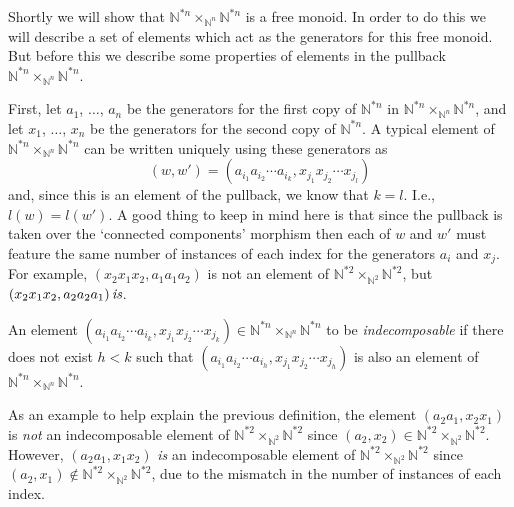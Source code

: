 Shortly we will show that $\mathbb{N}^{\ast n} \times_{\mathbb{N}^n} \mathbb{N}^{\ast n}$ is a free monoid. In order to do this we will describe a set of elements which act as the generators for this free monoid. But before this we describe some properties of elements in the pullback $\mathbb{N}^{\ast n} \times_{\mathbb{N}^n} \mathbb{N}^{\ast n}$. 

First, let $a_1$, $\ldots$, $a_n$ be the generators for the first copy of $\mathbb{N}^{\ast n}$ in $\mathbb{N}^{\ast n} \times_{\mathbb{N}^n} \mathbb{N}^{\ast n}$, and let $x_1$, $\ldots$, $x_n$ be the generators for the second copy of $\mathbb{N}^{\ast n}$. A typical element of $\mathbb{N}^{\ast n} \times_{\mathbb{N}^n} \mathbb{N}^{\ast n}$ can be written uniquely using these generators as
  \[
    (w,w') = \left(a_{i_1}a_{i_2}\cdots a_{i_k}, x_{j_1}x_{j_2}\cdots x_{j_l}\right)
  \]
and, since this is an element of the pullback, we know that $k = l$. I.e., $l(w) = l(w')$. A good thing to keep in mind here is that since the pullback is taken over the `connected components' morphism then each of $w$ and $w'$ must feature the same number of instances of each index for the generators $a_i$ and $x_j$. For example, $\left(x_2 x_1 x_2, a_1 a_1 a_2\right)$ is not an element of $\mathbb{N}^{\ast 2} \times_{\mathbb{N}^2} \mathbb{N}^{\ast 2}$, but $\left(x_2 x_1 x_2, a_2 a_2 a_1\right) \emph{is}$.

\begin{Defi}\label{indecomposable}
An element $\left(a_{i_1}a_{i_2}\cdots a_{i_k}, x_{j_1}x_{j_2}\cdots x_{j_k}\right) \in \mathbb{N}^{\ast n} \times_{\mathbb{N}^n} \mathbb{N}^{\ast n}$ to be \emph{indecomposable} if there does not exist $h < k$ such that $\left(a_{i_1}a_{i_2}\cdots a_{i_h}, x_{j_1}x_{j_2}\cdots x_{j_h}\right)$ is also an element of $\mathbb{N}^{\ast n} \times_{\mathbb{N}^n} \mathbb{N}^{\ast n}$. 
\end{Defi}

As an example to help explain the previous definition, the element $(a_2 a_1, x_2 x_1)$ is \emph{not} an indecomposable element of $\mathbb{N}^{\ast 2} \times_{\mathbb{N}^2} \mathbb{N}^{\ast 2}$ since $(a_2, x_2) \in \mathbb{N}^{\ast 2} \times_{\mathbb{N}^2} \mathbb{N}^{\ast 2}$. However, $(a_2 a_1, x_1 x_2)$ \emph{is} an indecomposable element of $\mathbb{N}^{\ast 2} \times_{\mathbb{N}^2} \mathbb{N}^{\ast 2}$ since $(a_2, x_1) \notin \mathbb{N}^{\ast 2} \times_{\mathbb{N}^2} \mathbb{N}^{\ast 2}$, due to the mismatch in the number of instances of each index.

